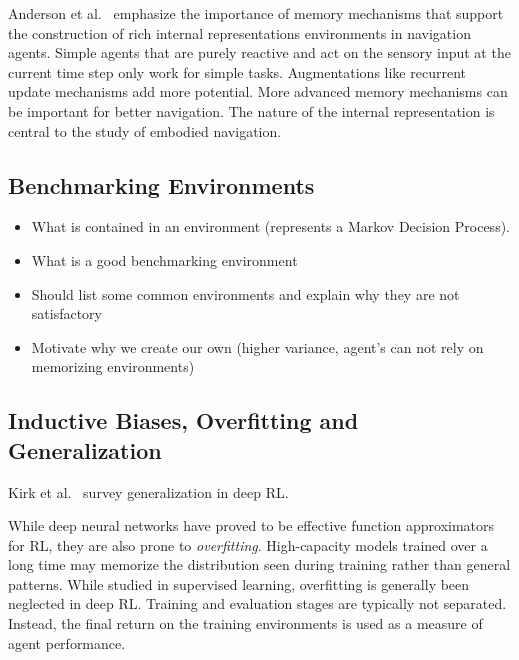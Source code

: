 Anderson et al.~\cite{anderson_evaluation_2018} emphasize the importance of memory mechanisms that support the construction of rich internal representations environments in navigation agents.
Simple agents that are purely reactive and act on the sensory input at the current time step only work for simple tasks.
Augmentations like recurrent update mechanisms add more potential.
More advanced memory mechanisms can be important for better navigation.
The nature of the internal representation is central to the study of embodied navigation.
% 

\subsection{Benchmarking Environments}

\begin{itemize}
    \item What is contained in an environment (represents a Markov Decision Process).
    \item What is a good benchmarking environment
    \item Should list some common environments and explain why they are not satisfactory
    \item Motivate why we create our own (higher variance, agent's can not rely on memorizing environments)
\end{itemize}

\subsection{Inductive Biases, Overfitting and Generalization}


Kirk et al.~\cite{kirk_survey_2022} survey generalization in deep RL.


While deep neural networks have proved to be effective function approximators for RL, they are also prone to \textit{overfitting}.
High-capacity models trained over a long time may memorize the distribution seen during training rather than general patterns.
While studied in supervised learning, overfitting is generally been neglected in deep RL.
Training and evaluation stages are typically not separated.
Instead, the final return on the training environments is used as a measure of agent performance.

